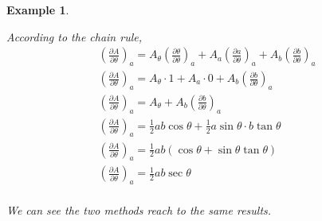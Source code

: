 \documentclass{article}
\newtheorem{example}{Example}
\begin{document}
\begin{example}
\begin{itemize}
      According to the chain rule,
      \begin{gather*}
        (\frac{\partial A}{\partial \theta})_a = A_\theta (\frac{\partial \theta}{\partial \theta})_a + A_a (\frac{\partial a}{\partial \theta})_a + A_b (\frac{\partial b}{\partial \theta})_a \\
        (\frac{\partial A}{\partial \theta})_a = A_\theta \cdot 1 + A_a \cdot 0 + A_b (\frac{\partial b}{\partial \theta})_a \\
        (\frac{\partial A}{\partial \theta})_a = A_\theta + A_b (\frac{\partial b}{\partial \theta})_a \\
        (\frac{\partial A}{\partial \theta})_a = \frac{1}{2}ab\cos\theta + \frac{1}{2}a\sin\theta \cdot b\tan\theta \\
        (\frac{\partial A}{\partial \theta})_a = \frac{1}{2}ab(\cos\theta + \sin\theta \tan\theta) \\
        (\frac{\partial A}{\partial \theta})_a = \frac{1}{2}ab\sec\theta \\
      \end{gather*}
  \end{itemize}
  We can see the two methods reach to the same results.
\end{example}
\end{document}
